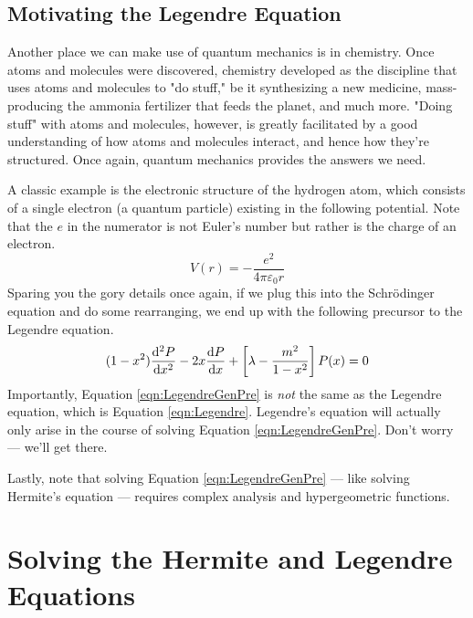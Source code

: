 \documentclass[titlepage]{article}
\numberwithin{equation}{section}
\begin{document}
\subsection{Motivating the Legendre Equation}
Another place we can make use of quantum mechanics is in chemistry. Once atoms and molecules were discovered, chemistry developed as the discipline that uses atoms and molecules to "do stuff," be it synthesizing a new medicine, mass-producing the ammonia fertilizer that feeds the planet, and much more. "Doing stuff" with atoms and molecules, however, is greatly facilitated by a good understanding of how atoms and molecules interact, and hence how they're structured. Once again, quantum mechanics provides the answers we need.\par
A classic example is the electronic structure of the hydrogen atom, which consists of a single electron (a quantum particle) existing in the following potential. Note that the $e$ in the numerator is not Euler's number but rather is the charge of an electron.
\begin{equation*}
    V(r) = -\frac{e^2}{4\pi\varepsilon_0r}
\end{equation*}
Sparing you the gory details once again, if we plug this into the Schr\"{o}dinger equation and do some rearranging, we end up with the following precursor to the Legendre equation.
\begin{equation}\label{eqn:LegendreGenPre}
    (1-x^2)\dv[2]{P}{x}-2x\dv{P}{x}+\left[ \lambda-\frac{m^2}{1-x^2} \right]P(x) = 0
\end{equation}
Importantly, Equation \ref{eqn:LegendreGenPre} is \emph{not} the same as the Legendre equation, which is Equation \ref{eqn:Legendre}. Legendre's equation will actually only arise in the course of solving Equation \ref{eqn:LegendreGenPre}. Don't worry --- we'll get there.\par
Lastly, note that solving Equation \ref{eqn:LegendreGenPre} --- like solving Hermite's equation --- requires complex analysis and hypergeometric functions.
\newpage



\section{Solving the Hermite and Legendre Equations}\label{sse:solving}
\end{document}
